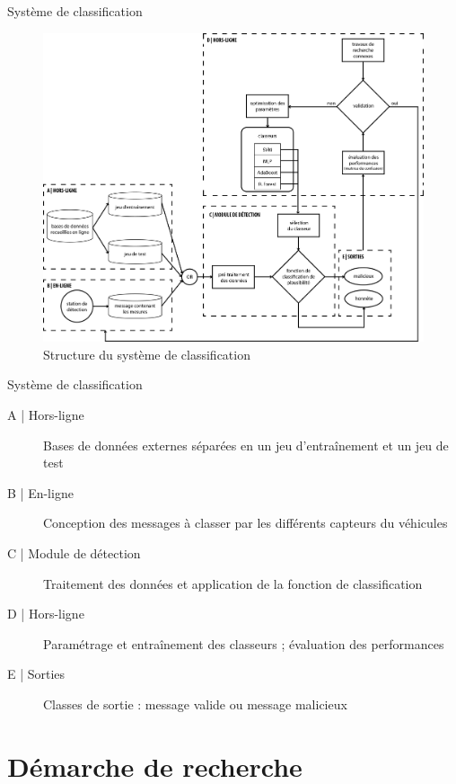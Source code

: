 \documentclass[usenames,dvipsnames]{beamer}
\begin{document}
\begin{frame}{Système de classification}
\begin{figure}
\centering
\includegraphics[width=.7\textwidth]{img/structure.png}
\caption{Structure du système de classification}
\end{figure}
\end{frame}

\begin{frame}{Système de classification}
\begin{description}
\item[A | Hors-ligne] Bases de données externes séparées en un jeu d'entraînement et un jeu de test
\item[B | En-ligne] Conception des messages à classer par les différents capteurs du véhicules
\item[C | Module de détection] Traitement des données et application de la fonction de classification
\item[D | Hors-ligne] Paramétrage et entraînement des classeurs ; évaluation des performances
\item[E | Sorties] Classes de sortie : message valide ou message malicieux
\end{description} 
\end{frame}

\section{Démarche de recherche}
\end{document}
